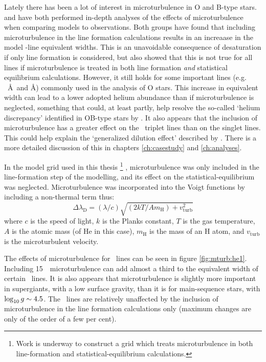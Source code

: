 Lately there has been a lot of interest in microturbulence in O and
B-type stars.  and  have both performed
in-depth analyses of the effects of microturbulence when comparing
models to observations. Both groups have found that including
microturbulence in the line formation calculations results in an
increaase in the model
\hei-line equivalent widths. This is an unavoidable consequence of
desaturation if only line formation is considered, but 
also showed that this is not true for all lines if microturbulence is
treated in both line formation \emph{and} statistical equilibrium
calculations. However, it still holds for some important lines
(e.g. \hei~\AA\ and \AA) commonly used in the analysis
of O stars.  This increase in equivalent width can lead to a
lower adopted helium abundance than if microturbulence is neglected,
something that could, at least partly, help resolve the so-called
`helium discrepancy' identified in OB-type stars by
. It also appears that the inclusion of microturbulence
has a greater effect on the \hei\ triplet lines than on the
singlet lines. This could help explain the `generalized dilution
effect' described by . There is a more detailed
discussion of this in chapters \ref{ch:casestudy} and
\ref{ch:analyses}.

In the model grid used in this thesis%
\footnote{Work is underway to construct a grid which treats
microturbulence in both line-formation and statistical-equilibrium
calculations.}%
, microturbulence was only
included in the line-formation step of the modelling, and its effect
on the statistical-equilibrium was neglected. Microturbulence was
incorporated into the Voigt functions by including a non-thermal term
thus:
\begin{equation}
\Delta \lambda_\mathrm{D} = (\lambda/c)\sqrt{(2kT/Am_\mathrm{H}) +
v_\mathrm{turb}^2}
\end{equation}
where $c$ is the speed of light, $k$ is the Planks constant, $T$ is the
gas temperature, $A$ is the atomic mass (of He in this case),
$m_\mathrm{H}$ is the mass of an H atom, and $v_\mathrm{turb}$ is the
microturbulent velocity.

The effects of microturbulence for \hei\ lines can be seen in figure
\ref{fig:mturb:he1}. Including 15~\kms\ microturbulence can add almost
a third to the equivalent width of certain \hei\ lines. It is also
appears that microturbulence is slightly more important in
supergiants, with a low surface gravity, than it is for main-sequence
stars, with $\log_{10}g \sim 4.5$. The \heii\ lines are relatively
unaffected by the inclusion of microturbulence in the line formation
calculations only (maximum changes are only of the order of a few per
cent).

